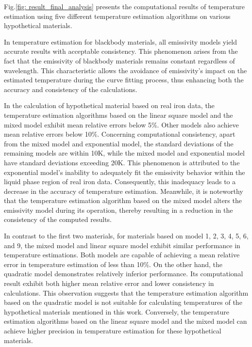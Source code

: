 Fig.\ref{fig: result_final_analysis} presents the computational results of 
temperature estimation using five different temperature estimation algorithms 
on various hypothetical materials. 


In temperature estimation for blackbody materials, all emissivity models yield accurate 
results with acceptable consistency. This phenomenon arises from the fact that 
the emissivity of blackbody materials remains constant regardless of wavelength.
This characteristic allows the avoidance of emissivity's impact on the estimated 
temperature during the curve fitting process, thus enhancing both the accuracy 
and consistency of the calculations.


In the calculation of hypothetical material based on real iron data, 
the temperature estimation algorithms based on the linear square model and the 
mixed model exhibit mean relative errors below 5\%. Other models also achieve 
mean relative errors below 10\%. Concerning computational consistency, 
apart from the mixed model and exponential model, the standard deviations of the 
remaining models are within 10K, while the mixed model and exponential model have 
standard deviations exceeding 20K. This phenomenon is attributed to the exponential 
model's inability to adequately 
fit the emissivity behavior within the liquid phase region of real iron data. 
Consequently, this inadequacy leads to a decrease in the accuracy of temperature 
estimation. Meanwhile, it is noteworthy that the temperature estimation algorithm 
based on the mixed model alters the emissivity model during its operation, thereby 
resulting in a reduction in the consistency of the computed results.


In contrast to the first two materials, for materials based on model 1, 2, 3, 4, 5, 
6, and 9, the mixed model and linear square model exhibit similar performance 
in temperature estimations. Both models are capable of achieving a mean relative 
error in temperature estimation of less than 10\%. On the other hand, the quadratic 
model demonstrates relatively inferior performance. Its computational result 
exhibit both higher mean relative error and lower consistency in calculations. 
This observation suggests that the temperature estimation algorithm based on the 
quadratic model is not suitable for calculating temperatures of the hypothetical 
materials mentioned in this work. Conversely, the temperature estimation algorithms 
based on the linear square model and the mixed model can achieve higher precision 
in temperature estimation for these hypothetical materials.


